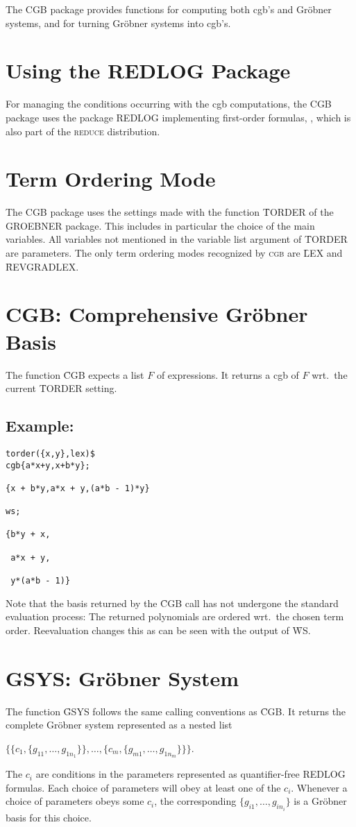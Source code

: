 \documentclass[11pt,letterpaper]{book}
\makeatletter
\newcommand{\underscore}{\_}
\newcommand{\ttindex}[1]{{\renewcommand{\_}{\protect\underscore}%
                          \index{#1@{\tt #1}}}}
\makeatother
\begin{document}
The CGB package provides functions for computing both {\sc cgb}'s and
Gr\"obner systems, and for turning Gr\"obner systems into {\sc cgb}'s.
%
\section{Using the REDLOG Package}
For managing the conditions occurring with the {\sc cgb} computations,
the CGB package uses the package REDLOG implementing first-order
formulas, \cite{DolzmannSturm:97a,DolzmannSturm:99}, which is also
part of the \textsc{reduce} distribution.
%
\section{Term Ordering Mode}
The CGB package uses the settings made with the function \f{TORDER}
of the GROEBNER package. This includes in particular the choice of the
main variables. All variables not mentioned in the variable list
argument of \f{TORDER} are parameters. The only term ordering modes
recognized by \textsc{cgb} are \f{LEX} and \f{REVGRADLEX}.
%
\section{CGB: Comprehensive Gr\"ob\-ner Basis}
The function \f{CGB}\ttindex{CGB} expects a list $F$ of expressions.
It returns a {\sc cgb} of $F$ wrt.~the current \f{TORDER} setting.
%
\subsection*{Example:}
{\small\begin{verbatim}
torder({x,y},lex)$
cgb{a*x+y,x+b*y};

{x + b*y,a*x + y,(a*b - 1)*y}

ws;

{b*y + x,

 a*x + y,

 y*(a*b - 1)}
\end{verbatim}}
Note that the basis returned by the \f{CGB} call has not undergone
the standard evaluation process: The returned polynomials are ordered
wrt.~the chosen term order. Reevaluation changes this as can be seen
with the output of \f{WS}.
%
\section{GSYS: Gr\"obner System}
The function \f{GSYS}\ttindex{GSYS} follows the same calling conventions as
\f{CGB}. It returns the complete Gr\"obner system represented as a nested
list
\begin{center}
\begin{tt}
$\bigl\{\bigl\{c_1,\{g_{11},\ldots,g_{1n_1}\}\bigr\},\dots,
\bigl\{c_m,\{g_{m1},\dots,g_{1n_m}\}\bigr\}\bigr\}$.
\end{tt}
\end{center}
The {\tt $c_i$} are conditions in the parameters represented as
quantifier-free REDLOG formulas. Each choice of parameters will obey
at least one of the {\tt $c_i$}. Whenever a choice of parameters obeys
some {\tt $c_i$}, the corresponding {\tt $\{g_{i1},\ldots,g_{in_i}\}$}
is a Gr\"obner basis for this choice.
%
\end{document}

